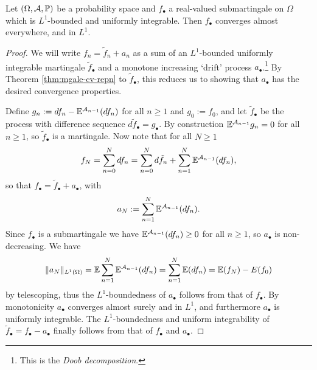 \begin{thm}\label{thm:submartingale-convergence}
  Let $(\Omega,\mathcal{A},\mathbb{P})$ be a probability space and $f_{\bullet}$ a real-valued submartingale on $\Omega$ which is $L^1$-bounded and uniformly integrable.
  Then $f_\bullet$ converges almost everywhere, and in $L^1$.
\end{thm}

\begin{proof}
  We will write $f_{n} = \tilde{f}_{n} + a_{n}$ as a sum of an $L^1$-bounded uniformly integrable martingale $\tilde{f}_{\bullet}$ and a monotone increasing `drift' process $a_{\bullet}$.\footnote{This is the \emph{Doob decomposition}.}
  By Theorem \ref{thm:mgale-cv-repn} to $\tilde{f}_{\bullet}$, this reduces us to showing that $a_{\bullet}$ has the desired convergence properties.

  Define $g_{n} := df_{n} - \mathbb{E}^{\mathcal{A}_{n-1}}(df_{n})$ for all $n \geq 1$ and $g_{0} := f_{0}$, and let $\tilde{f}_{\bullet}$ be the process with difference sequence $d\tilde{f}_{\bullet} = g_{\bullet}$.
  By construction $\mathbb{E}^{\mathcal{A}_{n-1}} g_{n} = 0$ for all $n \geq 1$, so $\tilde{f}_{\bullet}$ is a martingale.
  Now note that for all $N \geq 1$
  \begin{equation*}
    f_{N} = \sum_{n=0}^{N} df_{n} = \sum_{n=0}^{N} d\tilde{f}_{n} + \sum_{n=1}^{N} \mathbb{E}^{\mathcal{A}_{n-1}}(df_{n}),
  \end{equation*}
  so that $f_{\bullet} = \tilde{f}_{\bullet} + a_{\bullet}$, with
  \begin{equation*}
    a_{N} := \sum_{n=1}^{N} \mathbb{E}^{\mathcal{A}_{n-1}}(df_{n}). 
  \end{equation*}
  Since $f_{\bullet}$ is a submartingale we have $\mathbb{E}^{\mathcal{A}_{n-1}}(df_{n}) \geq 0$ for all $n \geq 1$, so $a_{\bullet}$ is non-decreasing.
  We have
  \begin{equation*}
    \|a_{N}\|_{L^1(\Omega)} = \mathbb{E} \sum_{n=1}^{N} \mathbb{E}^{\mathcal{A}_{n-1}}(df_{n}) = \sum_{n=1}^{N} \mathbb{E}(df_{n}) = \mathbb{E}(f_{N}) - E(f_{0})
  \end{equation*}
  by telescoping, thus the $L^1$-boundedness of $a_{\bullet}$ follows from that of $f_{\bullet}$.
  By monotonicity $a_{\bullet}$ converges almost surely and in $L^1$, and furthermore $a_{\bullet}$ is uniformly integrable.
  The $L^1$-boundedness and uniform integrability of $\tilde{f}_{\bullet} = f_{\bullet} - a_{\bullet}$ finally follows from that of $f_{\bullet}$ and $a_{\bullet}$.
  
\end{proof}

